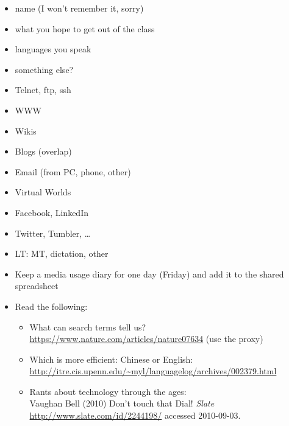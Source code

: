 \documentclass[a4paper,landscape,headrule,footrule,xetex]{foils}
\begin{document}









\begin{itemize}
\item name  (I won't remember it, sorry)
\item what you hope to get out of the class
\item languages you speak
\item something else?
\end{itemize}


\begin{itemize} \addtolength{\itemsep}{-0.5ex}
\item Telnet, ftp, ssh
\item WWW
\item Wikis
\item Blogs (overlap)
\item Email (from PC, phone, other)
\item Virtual Worlds
\item Facebook, LinkedIn
\item Twitter, Tumbler, \ldots
\item LT: MT, dictation, other
\end{itemize}



\begin{itemize}
\item Keep a media usage diary for one day (Friday) and add it to the shared spreadsheet

\item Read the following:
  \begin{itemize}
  \item What can search terms tell us?
    \\ \url{https://www.nature.com/articles/nature07634} (use the proxy)
  \item Which is more efficient: Chinese or English:
    \\ \url{http://itre.cis.upenn.edu/~myl/languagelog/archives/002379.html}
  \item Rants about technology through the ages: 
    \\ Vaughan Bell (2010) Don't touch that Dial! \textit{Slate}
    \\ \url{http://www.slate.com/id/2244198/} accessed 2010-09-03. 
  \end{itemize}
  
\end{itemize}


\end{document}
